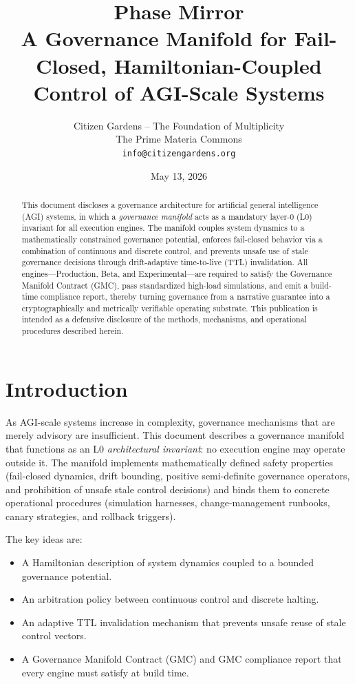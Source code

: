 \documentclass[11pt]{article}
\title{Phase Mirror \\ A Governance Manifold for Fail-Closed, Hamiltonian-Coupled Control of AGI-Scale Systems}
\author{Citizen Gardens -- The Foundation of Multiplicity\\
The Prime Materia Commons\\
\texttt{info@citizengardens.org}}
\date{May 13, 2026}
\begin{document}
\maketitle

\begin{abstract}
This document discloses a governance architecture for artificial general intelligence (AGI) systems, in which a \emph{governance manifold} acts as a mandatory layer-0 (L0) invariant for all execution engines.
The manifold couples system dynamics to a mathematically constrained governance potential, enforces fail-closed behavior via a combination of continuous and discrete control, and prevents unsafe use of stale governance decisions through drift-adaptive time-to-live (TTL) invalidation.
All engines---Production, Beta, and Experimental---are required to satisfy the Governance Manifold Contract (GMC), pass standardized high-load simulations, and emit a build-time compliance report, thereby turning governance from a narrative guarantee into a cryptographically and metrically verifiable operating substrate.
This publication is intended as a defensive disclosure of the methods, mechanisms, and operational procedures described herein.
\end{abstract}
\newpage
\tableofcontents

\section{Introduction}

As AGI-scale systems increase in complexity, governance mechanisms that are merely advisory are insufficient.
This document describes a governance manifold that functions as an L0 \emph{architectural invariant}: no execution engine may operate outside it.
The manifold implements mathematically defined safety properties (fail-closed dynamics, drift bounding, positive semi-definite governance operators, and prohibition of unsafe stale control decisions) and binds them to concrete operational procedures (simulation harnesses, change-management runbooks, canary strategies, and rollback triggers).

The key ideas are:
\begin{itemize}[noitemsep]
    \item A Hamiltonian description of system dynamics coupled to a bounded governance potential.
    \item An arbitration policy between continuous control and discrete halting.
    \item An adaptive TTL invalidation mechanism that prevents unsafe reuse of stale control vectors.
    \item A Governance Manifold Contract (GMC) and GMC compliance report that every engine must satisfy at build time.
\end{itemize}
\end{document}
